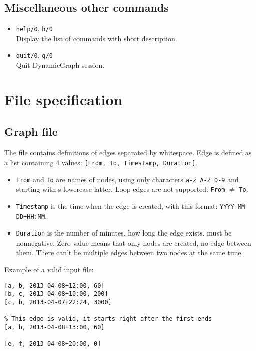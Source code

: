 \documentclass[11pt, a4paper,draft]{article}
\newcommand{\pl}[1]{\texttt{#1}} %
\theoremstyle{plain}
\theoremstyle{definition}
\theoremstyle{remark}
\begin{document}
\subsection{Miscellaneous other commands}

\begin{itemize}
\item \pl{help/0}, \pl{h/0} \\
Display the list of commands with short description.

\item \pl{quit/0}, \pl{q/0} \\
Quit DynamicGraph session.
\end{itemize}

\section{File specification}
\label{sec:files}

\subsection{Graph file}
\label{sec:files-graph}

The file contains definitions of edges separated by whitespace.
Edge is defined as a list containing 4 values: \pl{[From, To, Timestamp, Duration]}.

\begin{itemize}
	\item \pl{From} and \pl{To} are names of nodes, using only characters \texttt{a-z A-Z 0-9}
		and starting with s lowercase latter.	
		Loop edges are not supported: \pl{From} $\ne$ \pl{To}.
	\item \pl{Timestamp} is the time when the edge is created,
		with this format: \pl{YYYY-MM-DD+HH:MM}.
	\item \pl{Duration} is the number of minutes, how long the edge exists, must be nonnegative.
		Zero value means that only nodes are created, no edge between them.
		There can't be multiple edges between two nodes at the same time.
\end{itemize}
Example of a valid input file:

\begin{verbatim}
[a, b, 2013-04-08+12:00, 60]
[b, c, 2013-04-08+10:00, 200]
[c, b, 2013-04-07+22:24, 3000]

% This edge is valid, it starts right after the first ends
[a, b, 2013-04-08+13:00, 60]

[e, f, 2013-04-08+20:00, 0]

\end{verbatim}
\end{document}

